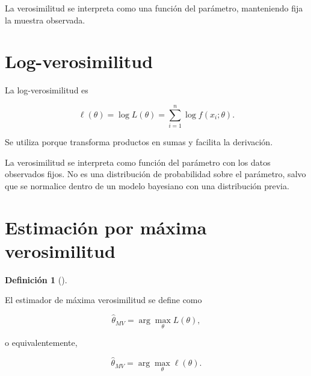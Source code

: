 \documentclass[
  spanish,
  10.5pt,
  letterpaper,
  DIV=11,
  numbers=noendperiod,
  oneside,
  open=any]{scrreprt}
\theoremstyle{definition}
\newtheorem{definition}{Definición}[chapter]
\theoremstyle{definition}
\theoremstyle{plain}
\theoremstyle{remark}
\begin{document}
La verosimilitud se interpreta como una función del parámetro,
manteniendo fija la muestra observada.

\section*{Log-verosimilitud}\label{log-verosimilitud}


La log-verosimilitud es

\[
\ell(\theta)
=
\log L(\theta)
=
\sum_{i=1}^{n}
\log f(x_i;\theta).
\]

Se utiliza porque transforma productos en sumas y facilita la
derivación.

\begin{tcolorbox}[enhanced jigsaw, arc=.35mm, bottomrule=.15mm, bottomtitle=1mm, breakable, colback=white, colbacktitle=quarto-callout-note-color!10!white, colframe=quarto-callout-note-color-frame, coltitle=black, left=2mm, leftrule=.75mm, opacityback=0, opacitybacktitle=0.6, rightrule=.15mm, title=\textcolor{quarto-callout-note-color}{\faInfo}\hspace{0.5em}{Máxima verosimilitud}, titlerule=0mm, toprule=.15mm, toptitle=1mm]

La verosimilitud se interpreta como función del parámetro con los datos
observados fijos. No es una distribución de probabilidad sobre el
parámetro, salvo que se normalice dentro de un modelo bayesiano con una
distribución previa.

\end{tcolorbox}

\section*{Estimación por máxima
verosimilitud}\label{estimaciuxf3n-por-muxe1xima-verosimilitud}


\begin{definition}[]\protect\hypertarget{def-maxima-verosimilitud}{}\label{def-maxima-verosimilitud}

El estimador de máxima verosimilitud se define como

\[
\widehat{\theta}_{MV}
=
\arg\max_{\theta}
L(\theta),
\]

o equivalentemente,

\[
\widehat{\theta}_{MV}
=
\arg\max_{\theta}
\ell(\theta).
\]

\end{definition}
\end{document}
